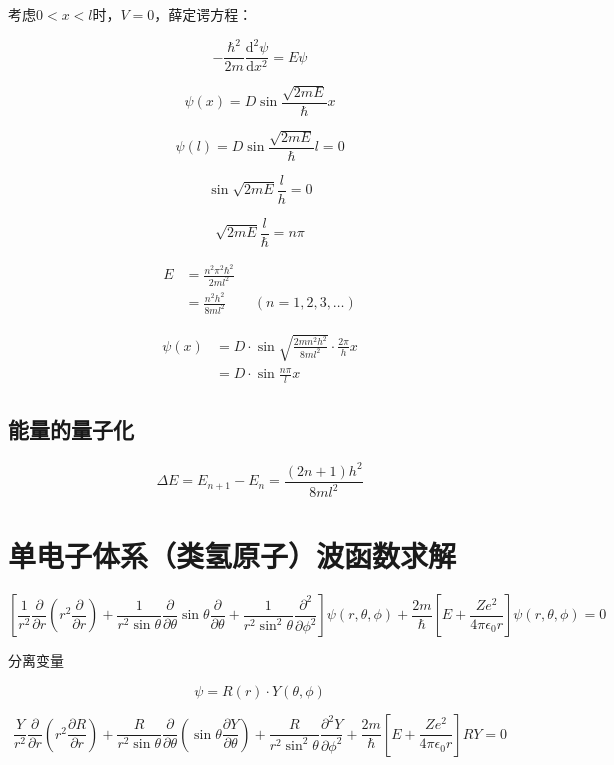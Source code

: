 \documentclass[a4paper]{ctexrep}
\renewcommand{\d}{\mathrm{d}}
\begin{document}
    考虑$0 < x < l$时，$V=0$，薛定谔方程：

    \[
        -\frac{\hbar^2}{2m} \frac{\d^2 \psi}{\d x^2} = E \psi
    \]

    \[
        \psi(x) = D \sin \frac{\sqrt{2mE}}{\hbar} x   
    \]

    \[
        \psi(l) = D \sin \frac{\sqrt{2mE}}{\hbar} l = 0
    \]

    \[
        \sin \sqrt{2mE} \frac{l}{h} = 0
    \]

    \[
        \sqrt{2mE} \frac{l}{\hbar} = n \pi 
    \]

    \begin{align*}
        E &= \frac{n^2\pi^2\hbar^2}{2ml^2} \\
        &= \frac{n^2h^2}{8ml^2} \qquad (n = 1, 2, 3, \dots)
    \end{align*}

    \begin{align*}
        \psi (x) &= D \cdot \sin \sqrt{\frac{2mn^2h^2}{8ml^2} } \cdot \frac{2\pi}{h} x \\
        &= D \cdot \sin \frac{n\pi}{l} x
    \end{align*}

    \subsection{能量的量子化}

    \[
        \Delta E = E_{n + 1} - E_n = \frac{(2n + 1)h^2}{8ml^2}  
    \]

    \section{单电子体系（类氢原子）波函数求解}



    \[
        \left[ \frac{1}{r^2} \frac{\partial}{\partial r} \left( r ^2 \frac{\partial}{\partial r} \right) + \frac{1}{r^2 \sin \theta} \frac{\partial}{\partial \theta} \sin \theta \frac{\partial}{\partial \theta} + \frac{1}{r^2 \sin ^2 \theta} \frac{\partial^2}{\partial \phi^2} \right]   \psi (r, \theta, \phi) + \frac{2m}{\hbar}\left[ E + \frac{Ze^2}{4\pi \epsilon_0 r }  \right] \psi(r, \theta, \phi) = 0
    \]

    分离变量

    \[
       \psi = R(r) \cdot Y(\theta, \phi)  
    \]

    \[
        \frac{Y}{r^2} \frac{\partial}{\partial r} \left( r^2 \frac{\partial R}{\partial r } \right) + \frac{R}{r^2 \sin \theta} \frac{\partial }{\partial \theta} \left(\sin \theta \frac{\partial Y}{\partial \theta} \right) + \frac{R}{r^2 \sin ^2 \theta} \frac{\partial^2 Y}{\partial \phi^2} + \frac{2m}{\hbar}\left[ E + \frac{Ze^2}{4\pi \epsilon_0 r }  \right] RY = 0
    \]
\end{document}

